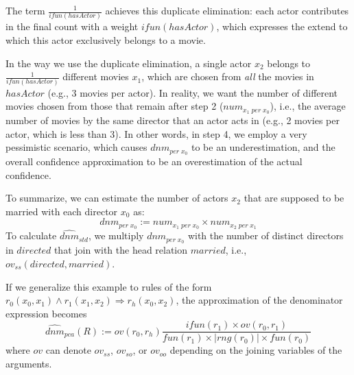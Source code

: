 {The term $\frac{1}{ifun(hasActor)}$ achieves this duplicate elimination: each actor contributes in the final count with a weight $ifun(hasActor)$, which expresses the extend to which this actor exclusively belongs to a movie.

In the way we use the duplicate elimination, a single actor $x_2$ belongs to $\frac{1}{ifun(hasActor)}$ different movies $x_1$, which are chosen from \emph{all} the movies in  $hasActor$ (e.g., 3 movies per actor).
In reality, we want the number of different movies chosen from those that remain after step 2 ($num_{x_1\; per \; x_0}$), %
i.e., the average number of movies by the same director that an actor acts in (e.g., 2 movies per actor, which is less than 3). %
In other words, in step 4, we employ a very pessimistic scenario, which causes $dnm_{per\; x_0}$ to be an underestimation, and the overall confidence approximation to be an overestimation of the actual confidence.

To summarize, we can estimate the number of actors $x_2$ that are supposed to be married with each director $x_0$ as:
$$
 dnm_{per\; x_0} :=  num_{x_1 \; per \; x_0} \times num_{x_2 \; per \; x_1}
$$
\noindent To calculate $\widehat{dnm}_{std}$, we multiply $dnm_{per\; x_0}$ with the number of distinct directors in $directed$ that join with the head relation $married$, i.e., $ov_{ss}(directed, married)$.

If we generalize this example to rules of the form $r_0(x_0,x_1) \wedge r_1(x_1,x_2) \Rightarrow r_h(x_0,x_2)$, the approximation of the denominator expression becomes
\[
  \widehat{dnm}_{pca}(R) := ov(r_0, r_h)\frac{ifun(r_1) \times ov(r_0,r_1)}{fun(r_1) \times |rng(r_0)| \times fun(r_0)}
\]
\noindent where $ov$ can denote $ov_{ss}$, $ov_{so}$, or $ov_{oo}$ depending on the joining variables of the arguments.

}
